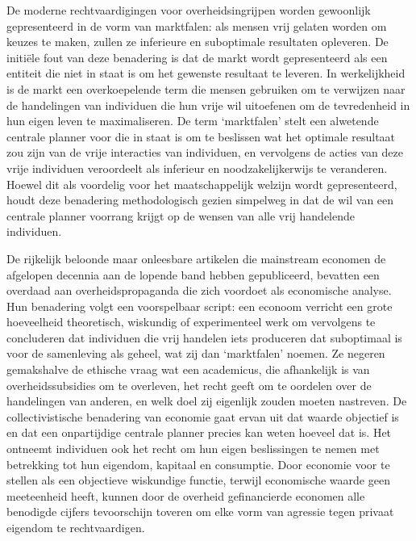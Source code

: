 \documentclass[
  a5paper,
  smalldemyvopaper,11pt,twoside,onecolumn,openright,extrafontsizes,
hidelinks]{memoir}
\begin{document}
De moderne rechtvaardigingen voor overheidsingrijpen worden gewoonlijk
gepresenteerd in de vorm van marktfalen: als mensen vrij gelaten worden
om keuzes te maken, zullen ze inferieure en suboptimale resultaten
opleveren. De initiële fout van deze benadering is dat de markt wordt
gepresenteerd als een entiteit die niet in staat is om het gewenste
resultaat te leveren. In werkelijkheid is de markt een overkoepelende
term die mensen gebruiken om te verwijzen naar de handelingen van
individuen die hun vrije wil uitoefenen om de tevredenheid in hun eigen
leven te maximaliseren. De term `marktfalen' stelt een alwetende
centrale planner voor die in staat is om te beslissen wat het optimale
resultaat zou zijn van de vrije interacties van individuen, en
vervolgens de acties van deze vrije individuen veroordeelt als inferieur
en noodzakelijkerwijs te veranderen. Hoewel dit als voordelig voor het
maatschappelijk welzijn wordt gepresenteerd, houdt deze benadering
methodologisch gezien simpelweg in dat de wil van een centrale planner
voorrang krijgt op de wensen van alle vrij handelende individuen.

De rijkelijk beloonde maar onleesbare artikelen die mainstream economen
de afgelopen decennia aan de lopende band hebben gepubliceerd, bevatten
een overdaad aan overheidspropaganda die zich voordoet als economische
analyse. Hun benadering volgt een voorspelbaar script: een econoom
verricht een grote hoeveelheid theoretisch, wiskundig of experimenteel
werk om vervolgens te concluderen dat individuen die vrij handelen iets
produceren dat suboptimaal is voor de samenleving als geheel, wat zij
dan `marktfalen' noemen. Ze negeren gemakshalve de ethische vraag wat
een academicus, die afhankelijk is van overheidssubsidies om te
overleven, het recht geeft om te oordelen over de handelingen van
anderen, en welk doel zij eigenlijk zouden moeten nastreven. De
collectivistische benadering van economie gaat ervan uit dat waarde
objectief is en dat een onpartijdige centrale planner precies kan weten
hoeveel dat is. Het ontneemt individuen ook het recht om hun eigen
beslissingen te nemen met betrekking tot hun eigendom, kapitaal en
consumptie. Door economie voor te stellen als een objectieve wiskundige
functie, terwijl economische waarde geen meeteenheid heeft, kunnen door
de overheid gefinancierde economen alle benodigde cijfers tevoorschijn
toveren om elke vorm van agressie tegen privaat eigendom te
rechtvaardigen.
\end{document}
